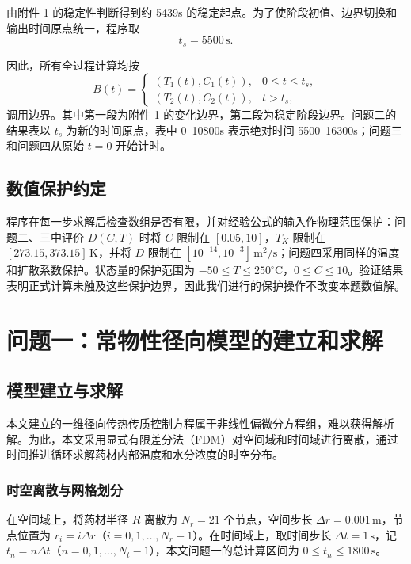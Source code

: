 \documentclass[withoutpreface,bwprint]{cumcm_thesis}
\begin{document}
由附件 1 的稳定性判断得到约 5439s 的稳定起点。为了使阶段初值、边界切换和输出时间原点统一，程序取
\begin{equation}
t_s = 5500\,\text{s}.
\end{equation}

因此，所有全过程计算均按
\begin{equation}
B(t) = 
\begin{cases}
(T_1(t), C_1(t)), & 0 \le t \le t_s, \\
(T_2(t), C_2(t)), & t > t_s,
\end{cases}
\end{equation}
调用边界。其中第一段为附件 1 的变化边界，第二段为稳定阶段边界。问题二的结果表以 \(t_s\) 为新的时间原点，表中 0~10800s 表示绝对时间 5500~16300s；问题三和问题四从原始 \(t = 0\) 开始计时。

\subsection{数值保护约定}

程序在每一步求解后检查数组是否有限，并对经验公式的输入作物理范围保护：问题二、三中评价 \(D(C,T)\) 时将 \(C\) 限制在 \([0.05, 10]\)，\(T_K\) 限制在 \([273.15, 373.15]\,\text{K}\)，并将 \(D\) 限制在 \([10^{-14}, 10^{-3}]\,\text{m}^2/\text{s}\)；问题四采用同样的温度和扩散系数保护。状态量的保护范围为 \(-50 \le T \le 250^\circ\text{C}\)，\(0 \le C \le 10\)。验证结果表明正式计算未触及这些保护边界，因此我们进行的保护操作不改变本题数值解。


\section{问题一：常物性径向模型的建立和求解}
\subsection{模型建立与求解}

本文建立的一维径向传热传质控制方程属于非线性偏微分方程组，难以获得解析解。为此，本文采用显式有限差分法（FDM）对空间域和时间域进行离散，通过时间推进循环求解药材内部温度和水分浓度的时空分布。

\subsubsection{时空离散与网格划分}

在空间域上，将药材半径 \(R\) 离散为 \(N_r = 21\) 个节点，空间步长 \(\Delta r = 0.001\,\text{m}\)，节点位置为 \(r_i = i\Delta r\)（\(i = 0,1,\dots,N_r-1\)）。在时间域上，取时间步长 \(\Delta t = 1\,\text{s}\)，记 \(t_n = n\Delta t\)（\(n = 0,1,\dots,N_t-1\)），本文问题一的总计算区间为 \(0 \le t_n \le 1800\,\text{s}\)。
\end{document}
